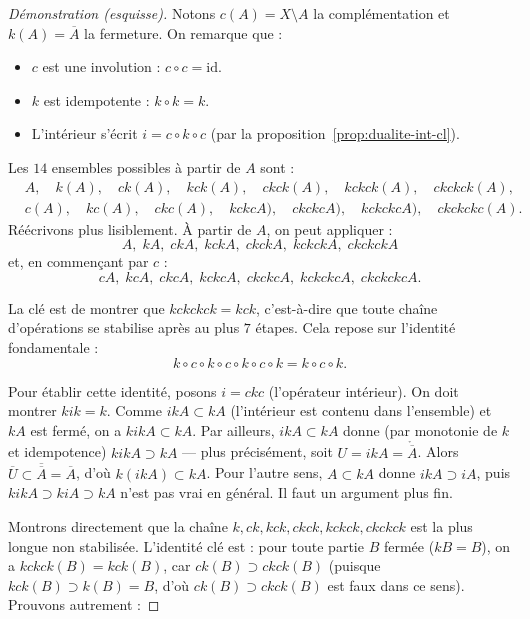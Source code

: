 \documentclass[12pt,a4paper,openany]{book}
\theoremstyle{definition}
\theoremstyle{cours}
\theoremstyle{coursnormal}
\newcommand{\Int}[1]{\mathring{#1}}
\newcommand{\Cl}[1]{\overline{#1}}
\begin{document}
\begin{proof}[Démonstration (esquisse)]
  Notons $c(A) = X \setminus A$ la complémentation et $k(A) = \Cl{A}$ la fermeture. On remarque que :
  \begin{itemize}
    \item $c$ est une involution : $c \circ c = \mathrm{id}$.
    \item $k$ est idempotente : $k \circ k = k$.
    \item L'intérieur s'écrit $i = c \circ k \circ c$ (par la proposition~\ref{prop:dualite-int-cl}).
  \end{itemize}

  Les $14$ ensembles possibles à partir de $A$ sont :
  \begin{align*}
    &A, \quad k(A), \quad ck(A), \quad kck(A), \quad ckck(A), \quad kckck(A), \quad ckckck(A), \\
    &c(A), \quad kc(A), \quad ckc(A), \quad kckcA), \quad ckckcA), \quad kckckcA), \quad ckckckc(A).
  \end{align*}
  Réécrivons plus lisiblement. À partir de $A$, on peut appliquer :
  \[
    A,\; kA,\; ckA,\; kckA,\; ckckA,\; kckckA,\; ckckckA
  \]
  et, en commençant par $c$ :
  \[
    cA,\; kcA,\; ckcA,\; kckcA,\; ckckcA,\; kckckcA,\; ckckckcA.
  \]

  La clé est de montrer que $kckckck = kck$, c'est-à-dire que toute chaîne d'opérations se stabilise après au plus $7$ étapes. Cela repose sur l'identité fondamentale :
  \[
    k \circ c \circ k \circ c \circ k \circ c \circ k = k \circ c \circ k.
  \]

  Pour établir cette identité, posons $i = ckc$ (l'opérateur intérieur). On doit montrer $kik = k$. Comme $ikA \subset kA$ (l'intérieur est contenu dans l'ensemble) et $kA$ est fermé, on a $kikA \subset kA$. Par ailleurs, $ikA \subset kA$ donne (par monotonie de $k$ et idempotence) $kikA \supset kA$ --- plus précisément, soit $U = ikA = \Int{\Cl{A}}$. Alors $\Cl{U} \subset \Cl{\Cl{A}} = \Cl{A}$, d'où $k(ikA) \subset kA$. Pour l'autre sens, $A \subset kA$ donne $ikA \supset iA$, puis $kikA \supset kiA \supset kA$ n'est pas vrai en général. Il faut un argument plus fin.

  Montrons directement que la chaîne $k, ck, kck, ckck, kckck, ckckck$ est la plus longue non stabilisée. L'identité clé est : pour toute partie $B$ fermée ($kB = B$), on a $kckck(B) = kck(B)$, car $ck(B) \supset ckck(B)$ (puisque $kck(B) \supset k(B) = B$, d'où $ck(B) \supset ckck(B)$ est faux dans ce sens). Prouvons autrement :


\end{proof}
\end{document}
